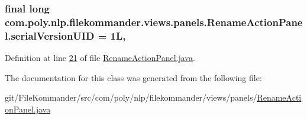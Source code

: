 \hypertarget{classcom_1_1poly_1_1nlp_1_1filekommander_1_1views_1_1panels_1_1_rename_action_panel_a2d285c84e4044412ee2587ff1b4f471b}{
\subsubsection[{serial\-Version\-U\-I\-D}]{\setlength{\rightskip}{0pt plus 5cm}final long com.\-poly.\-nlp.\-filekommander.\-views.\-panels.\-Rename\-Action\-Panel.\-serial\-Version\-U\-I\-D = 1\-L\hspace{0.3cm}{\ttfamily [static]}, {\ttfamily [private]}}}\label{classcom_1_1poly_1_1nlp_1_1filekommander_1_1views_1_1panels_1_1_rename_action_panel_a2d285c84e4044412ee2587ff1b4f471b}


Definition at line \hyperlink{L21}{21} of file \hyperlink{}{Rename\-Action\-Panel.\-java}.



The documentation for this class was generated from the following file\-:\begin{DoxyCompactItemize}
\item 
git/\-File\-Kommander/src/com/poly/nlp/filekommander/views/panels/\hyperlink{_rename_action_panel_8java}{Rename\-Action\-Panel.\-java}\end{DoxyCompactItemize}
